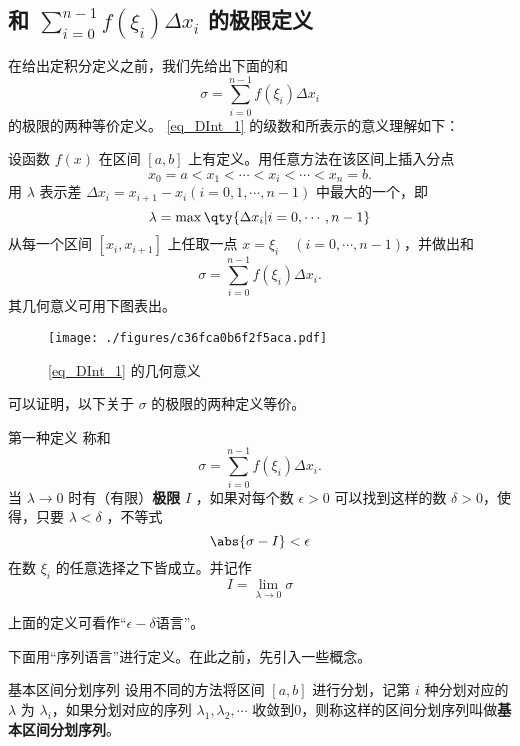 
\subsection{和 $\sum_{i=0}^{n-1}f(\xi_i)\Delta x_i$ 的极限定义}
在给出定积分定义之前，我们先给出下面的和
\begin{equation}\label{eq_DInt_1}
\sigma=\sum_{i=0}^{n-1}f(\xi_i)\Delta x_i
\end{equation}
的极限的两种等价定义。
\autoref{eq_DInt_1} 的级数和所表示的意义理解如下：

设函数 $f(x)$ 在区间 $[a,b]$ 上有定义。用任意方法在该区间上插入分点
\begin{equation}
x_0=a<x_1<\cdots<x_i<\cdots<x_n=b.
\end{equation}
用 $\lambda$ 表示差 $\Delta x_i=x_{i+1}-x_i(i=0,1,\cdots,n-1)$ 中最大的一个，即
\begin{equation}
\lambda=\max\qty{\Delta x_i|i=0,\cdots,n-1}
\end{equation}
从每一个区间 $[x_i,x_{i+1}]$ 上任取一点 $x=\xi_i\quad (i=0,\cdots,n-1)$，并做出和
\begin{equation}
\sigma=\sum_{i=0}^{n-1}f(\xi_i)\Delta x_i.
\end{equation}
其几何意义可用下图表出。
\begin{figure}[ht]
\centering
\texttt{[image: ./figures/c36fca0b6f2f5aca.pdf]}
\caption{\autoref{eq_DInt_1} 的几何意义} \label{fig_DInt1}
\end{figure}
可以证明，以下关于 $\sigma$ 的极限的两种定义等价。
\begin{definition}{第一种定义}\label{def_DInt_1}
称和
\begin{equation}
\sigma=\sum_{i=0}^{n-1}f(\xi_i)\Delta x_i.
\end{equation}
当 $\lambda\rightarrow0$ 时有（有限）\textbf{极限} $I$ ，如果对每个数 $\epsilon>0$ 可以找到这样的数 $\delta>0$，使得，只要 $\lambda<\delta$ ，不等式
\begin{equation}
\abs{\sigma-I}<\epsilon
\end{equation}
在数 $\xi_i$ 的任意选择之下皆成立。并记作
\begin{equation}
I=\lim_{\lambda\rightarrow0}\sigma
\end{equation}
\end{definition}
上面的定义可看作“$\epsilon-\delta$语言”。 

下面用“序列语言”进行定义。在此之前，先引入一些概念。
\begin{definition}{基本区间分划序列}\label{def_DInt_2}
设用不同的方法将区间 $[a,b]$ 进行分划，记第 $i$ 种分划对应的 $\lambda$ 为 $\lambda_i$，如果分划对应的序列 $\lambda_1,\lambda_2,\cdots$ 收敛到0，则称这样的区间分划序列叫做\textbf{基本区间分划序列}。
\end{definition}

